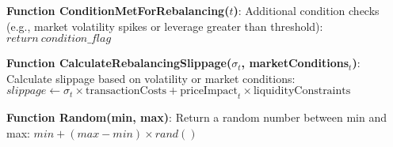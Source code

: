 \begin{algorithm}
\begin{algorithmic}[1]
		\STATE \textbf{Function ConditionMetForRebalancing($t$)}:
		\STATE \quad Additional condition checks (e.g., market volatility spikes or leverage greater than threshold): $return \ condition\_flag$
		
		\STATE \textbf{Function CalculateRebalancingSlippage($\sigma_t$, marketConditions$_t$)}:
		\STATE \quad Calculate slippage based on volatility or market conditions:
		\STATE \quad $slippage \gets \sigma_t \times \text{transactionCosts} + \text{priceImpact}_t \times \text{liquidityConstraints}$
		
		\STATE \textbf{Function Random(min, max)}:
		\STATE \quad Return a random number between min and max: $min + (max - min) \times rand()$
		
	\end{algorithmic}
\end{algorithm}